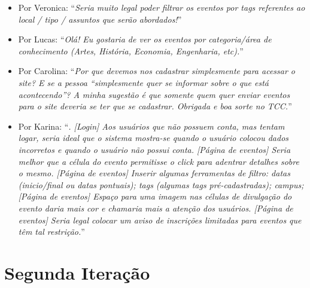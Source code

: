\begin{itemize}

\item Por Veronica: ``\emph{Seria muito legal poder filtrar os eventos por tags referentes ao local / tipo / assuntos que serão abordados!}''

\item Por Lucas: ``\emph{Olá! Eu gostaria de ver os eventos por categoria/área de conhecimento (Artes, História, Economia, Engenharia, etc).}''

\item Por Carolina: ``\emph{Por que devemos nos cadastrar simplesmente para acessar o site? E se a pessoa ``simplesmente quer se informar sobre o que está acontecendo''? A minha sugestão é que somente quem quer enviar eventos para o site deveria se ter que se cadastrar. Obrigada e boa sorte no TCC.}''

\item Por Karina: ``\emph{. [Login] Aos usuários que não possuem conta, mas tentam logar, seria ideal que o sistema mostra-se quando o usuário colocou dados incorretos e quando o usuário não possui conta. [Página de eventos] Seria melhor que a célula do evento permitisse o click para adentrar detalhes sobre o mesmo. [Página de eventos] Inserir algumas ferramentas de filtro: datas (inicio/final ou datas pontuais); tags (algumas tags pré-cadastradas); campus; [Página de eventos] Espaço para uma imagem nas células de divulgação do evento daria mais cor e chamaria mais a atenção dos usuários. [Página de eventos] Seria legal colocar um aviso de inscrições limitadas para eventos que têm tal restrição.}''

\end{itemize}
\section{Segunda Iteração}
